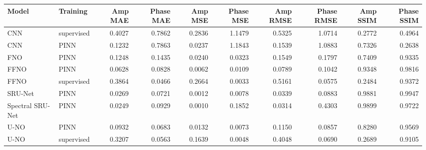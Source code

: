 \begin{tabular}{llrrrrrrrr}
\toprule
Model & Training & Amp MAE & Phase MAE & Amp MSE & Phase MSE & Amp RMSE & Phase RMSE & Amp SSIM & Phase SSIM \\
\midrule
CNN & supervised & 0.4027 & 0.7862 & 0.2836 & 1.1479 & 0.5325 & 1.0714 & 0.2772 & 0.4964 \\
CNN & PINN & 0.1232 & 0.7863 & 0.0237 & 1.1843 & 0.1539 & 1.0883 & 0.7326 & 0.2638 \\
FNO & PINN & 0.1248 & 0.1435 & 0.0240 & 0.0323 & 0.1549 & 0.1797 & 0.7409 & 0.9335 \\
FFNO & PINN & 0.0628 & 0.0828 & 0.0062 & 0.0109 & 0.0789 & 0.1042 & 0.9348 & 0.9816 \\
FFNO & supervised & 0.3864 & 0.0466 & 0.2664 & 0.0033 & 0.5161 & 0.0575 & 0.2484 & 0.9372 \\
SRU-Net & PINN & 0.0269 & 0.0721 & 0.0012 & 0.0078 & 0.0339 & 0.0883 & 0.9881 & 0.9947 \\
Spectral SRU-Net & PINN & 0.0249 & 0.0929 & 0.0010 & 0.1852 & 0.0314 & 0.4303 & 0.9899 & 0.9722 \\
U-NO & PINN & 0.0932 & 0.0683 & 0.0132 & 0.0073 & 0.1150 & 0.0857 & 0.8280 & 0.9569 \\
U-NO & supervised & 0.3207 & 0.0563 & 0.1639 & 0.0048 & 0.4048 & 0.0690 & 0.2689 & 0.9105 \\
\bottomrule
\end{tabular}
